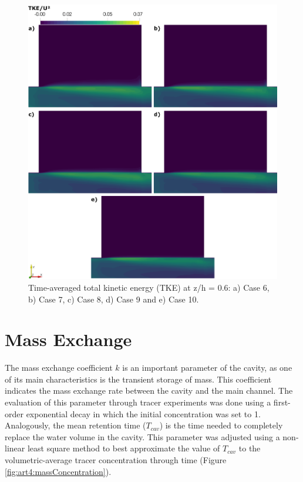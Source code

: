 \begin{figure}[!htb]
\centering
\includegraphics[width=\linewidth]{../images/art4/totalTKEMean2.jpeg}
\caption{Time-averaged total kinetic energy (TKE) at z/h = 0.6: a) Case 6, b) Case 7, c) Case 8, d) Case 9 and e) Case 10.}
\label{fig:art4:totalTKEMean2}
\end{figure}
\FloatBarrier
\section{Mass Exchange}
The mass exchange coefficient $k$ is an important parameter of the cavity, as one of its main characteristics is the transient storage of mass. This coefficient indicates the mass exchange rate between the cavity and the main channel. The evaluation of this parameter through tracer experiments was done using a first-order exponential decay in which the initial concentration was set to 1. Analogously, the mean retention time ($T_{cav}$) is the time needed to completely replace the water volume in the cavity. This parameter was adjusted using a non-linear least square method to best approximate the value of $T_{cav}$ to the volumetric-average tracer concentration through time \cite{weitbrecht2004} (Figure \ref{fig:art4:massConcentration}).

